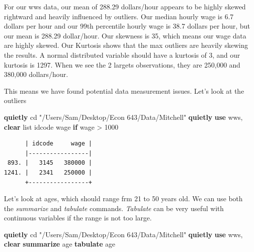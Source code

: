 \documentclass[
]{book}
\newenvironment{Shaded}{\begin{snugshade}}{\end{snugshade}}
\newcommand{\KeywordTok}[1]{\textcolor[rgb]{0.13,0.29,0.53}{\textbf{#1}}}
\newcommand{\NormalTok}[1]{#1}
\newcommand{\OtherTok}[1]{\textcolor[rgb]{0.56,0.35,0.01}{#1}}
\newcommand{\StringTok}[1]{\textcolor[rgb]{0.31,0.60,0.02}{#1}}
\begin{document}
For our wws data, our mean of 288.29 dollars/hour appears to be highly skewed rightward and heavily influenced by outliers. Our median hourly wage is 6.7 dollars per hour and our 99th percentile hourly wage is 38.7 dollars per hour, but our mean is 288.29 dollar/hour. Our skewness is 35, which means our wage data are highly skewed. Our Kurtosis shows that the max outliers are heavily skewing the results. A normal distributed variable should have a kurtosis of 3, and our kurtosis is 1297. When we see the 2 largets observations, they are 250,000 and 380,000 dollars/hour.

This means we have found potential data measurement issues. Let's look at the outliers

\begin{Shaded}
\begin{Highlighting}[]
\KeywordTok{quietly}\NormalTok{ cd }\StringTok{"/Users/Sam/Desktop/Econ 643/Data/Mitchell"}
\KeywordTok{quietly} \KeywordTok{use}\NormalTok{ wws, }\KeywordTok{clear}
\OtherTok{list}\NormalTok{ idcode wage }\KeywordTok{if}\NormalTok{ wage \textgreater{} 1000}
\end{Highlighting}
\end{Shaded}

\begin{verbatim}
      | idcode     wage |
      |-----------------|
 893. |   3145   380000 |
1241. |   2341   250000 |
      +-----------------+
\end{verbatim}

Let's look at ages, which should range frm 21 to 50 years old. We can use both
the \emph{summarize} and \emph{tabulate} commands. \emph{Tabulate} can be very useful with
continuous variables if the range is not too large.

\begin{Shaded}
\begin{Highlighting}[]
\KeywordTok{quietly}\NormalTok{ cd }\StringTok{"/Users/Sam/Desktop/Econ 643/Data/Mitchell"}
\KeywordTok{quietly} \KeywordTok{use}\NormalTok{ wws, }\KeywordTok{clear}
\KeywordTok{summarize}\NormalTok{ age}
\KeywordTok{tabulate}\NormalTok{ age}
\end{Highlighting}
\end{Shaded}
\end{document}
